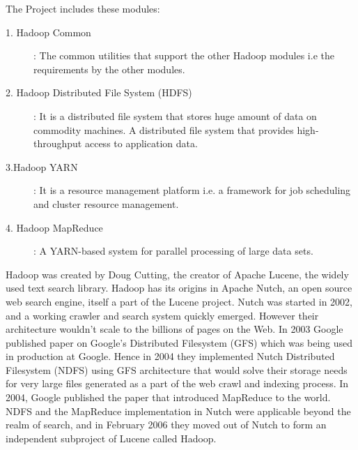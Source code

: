 The Project includes these modules:
\begin{description}
\item[1. Hadoop Common]:  The common utilities that support the other Hadoop modules i.e  the requirements by the other modules.
\item[2. Hadoop Distributed File System (HDFS)]: It is a distributed file system that stores huge amount of data on commodity machines. A distributed file system that provides  high-throughput access to application data.
\item[3.Hadoop YARN]: It is a resource management platform i.e. a framework for job scheduling and cluster resource management.
\item[4. Hadoop MapReduce]: A YARN-based system for parallel processing of large data sets.

\end{description}
Hadoop was created by Doug Cutting, the creator of Apache Lucene, the widely used text search library. Hadoop has its origins in Apache Nutch, an open source web search engine, itself a part of the Lucene project.
Nutch was started in 2002, and a working crawler and search system quickly emerged. However their architecture wouldn’t scale to the billions of pages on the Web. In 2003 Google published paper on Google’s Distributed Filesystem (GFS) which was being used in production at Google. Hence in 2004 they implemented Nutch Distributed Filesystem  (NDFS) using GFS architecture that would solve their storage needs for very large files generated as a part of the web crawl and indexing process.
In 2004, Google published the paper that introduced MapReduce to the world. NDFS and the MapReduce implementation in Nutch were applicable beyond the realm of search, and in February 2006 they moved out of Nutch to form an independent subproject of Lucene called Hadoop.

